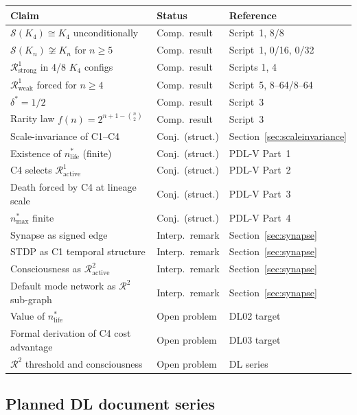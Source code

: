 \documentclass[12pt,a4paper]{article}
\theoremstyle{plain}
\theoremstyle{definition}
\theoremstyle{remark}
\newcommand{\Kfour}{K_4}
\newcommand{\Sop}{\mathcal{S}}
\newcommand{\Rop}{\mathcal{R}}
\begin{document}
\begin{center}
\begin{longtable}{p{6.5cm}p{2.8cm}p{4.5cm}}
\toprule
\textbf{Claim} & \textbf{Status} & \textbf{Reference} \\
\midrule
\endhead
$\Sop(\Kfour) \cong \Kfour$ unconditionally & Comp.\ result & Script~1, 8/8 \\
$\Sop(K_n) \not\cong K_n$ for $n \geq 5$ & Comp.\ result & Script~1, 0/16, 0/32 \\
$\Rop^1_{\mathrm{strong}}$ in 4/8 $\Kfour$ configs & Comp.\ result & Scripts 1, 4 \\
$\Rop^1_{\mathrm{weak}}$ forced for $n \geq 4$ & Comp.\ result & Script~5, 8--64/8--64 \\
$\delta^{*} = 1/2$ & Comp.\ result & Script~3 \\
Rarity law $f(n) = 2^{n+1-\binom{n}{2}}$ & Comp.\ result & Script~3 \\
\midrule
Scale-invariance of C1--C4 & Conj.\ (struct.) & Section~\ref{sec:scaleinvariance} \\
Existence of $n^{*}_{\mathrm{life}}$ (finite) & Conj.\ (struct.) & PDL-V Part~1 \\
C4 selects $\Rop^1_{\mathrm{active}}$ & Conj.\ (struct.) & PDL-V Part~2 \\
Death forced by C4 at lineage scale & Conj.\ (struct.) & PDL-V Part~3 \\
$n^{*}_{\mathrm{max}}$ finite & Conj.\ (struct.) & PDL-V Part~4 \\
\midrule
Synapse as signed edge & Interp.\ remark & Section~\ref{sec:synapse} \\
STDP as C1 temporal structure & Interp.\ remark & Section~\ref{sec:synapse} \\
Consciousness as $\Rop^2_{\mathrm{active}}$ & Interp.\ remark & Section~\ref{sec:synapse} \\
Default mode network as $\Rop^2$ sub-graph & Interp.\ remark & Section~\ref{sec:synapse} \\
\midrule
Value of $n^{*}_{\mathrm{life}}$ & Open problem & DL02 target \\
Formal derivation of C4 cost advantage & Open problem & DL03 target \\
$\Rop^2$ threshold and consciousness & Open problem & DL series \\
\bottomrule
\end{longtable}
\end{center}

\subsection{Planned DL document series}
\end{document}
